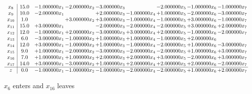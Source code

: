 \documentclass[10pt]{article}
\begin{document}
\[\begin{array}{c| c c@{\hskip 2pt} c@{\hskip 2pt} c@{\hskip 2pt} c@{\hskip 2pt} c@{\hskip 2pt} c@{\hskip 2pt} c@{\hskip 2pt} }
 x_{8}   &  15.0 & -1.000000 x_{1} & -2.000000 x_{2} & -3.000000 x_{3} &   & -2.000000 x_{5} & -1.000000 x_{6} & -1.000000 x_{7}\\
 x_{9}   &  10.0 & -2.000000 x_{1} &   & + 2.000000 x_{3} & -1.000000 x_{4} & + 1.000000 x_{5} & -2.000000 x_{6} & -3.000000 x_{7}\\
 x_{10}   &  1.0  &   & + 3.000000 x_{2} & + 3.000000 x_{3} & -1.000000 x_{4} & -1.000000 x_{5} & + 3.000000 x_{6} & -1.000000 x_{7}\\
 x_{11}   &  15.0 & + 3.000000 x_{1} &   & -2.000000 x_{3} & -2.000000 x_{4} & -2.000000 x_{5} & + 3.000000 x_{6} & + 2.000000 x_{7}\\
 x_{12}   &  12.0 & -1.000000 x_{1} & + 2.000000 x_{2} & -3.000000 x_{3} & + 3.000000 x_{4} & + 2.000000 x_{5} & -1.000000 x_{6} & -2.000000 x_{7}\\
 x_{13}   &  6.0 & -3.000000 x_{1} & -1.000000 x_{2} & + 1.000000 x_{3} & + 1.000000 x_{4} & -1.000000 x_{5} & + 2.000000 x_{6} &   \\
 x_{14}   &  12.0 & + 3.000000 x_{1} & -1.000000 x_{2} & + 1.000000 x_{3} & -1.000000 x_{4} & -2.000000 x_{5} & + 1.000000 x_{6} & -3.000000 x_{7}\\
 x_{15}   &  9.0 & + 1.000000 x_{1} & -2.000000 x_{2} & -3.000000 x_{3} & -2.000000 x_{4} & -2.000000 x_{5} & + 1.000000 x_{6} & + 3.000000 x_{7}\\
 x_{16}   &  7.0 & + 1.000000 x_{1} & + 1.000000 x_{2} & + 2.000000 x_{3} & + 2.000000 x_{4} & + 3.000000 x_{5} & -2.000000 x_{6} & + 3.000000 x_{7}\\
 x_{17}   &  14.0 & + 3.000000 x_{1} & -3.000000 x_{2} & + 1.000000 x_{3} & + 2.000000 x_{4} & + 2.000000 x_{5} & + 2.000000 x_{6} & -2.000000 x_{7}\\
\hline
z    &  0.0 & -1.000000 x_{1} & -1.000000 x_{2} & -1.000000 x_{3} & -2.000000 x_{4} & -2.000000 x_{5} & + 1.000000 x_{6} & + 2.000000 x_{7}\\
\end{array}\]


 $ x_{6} $ enters and $ x_{16} $ leaves 
\end{document}
